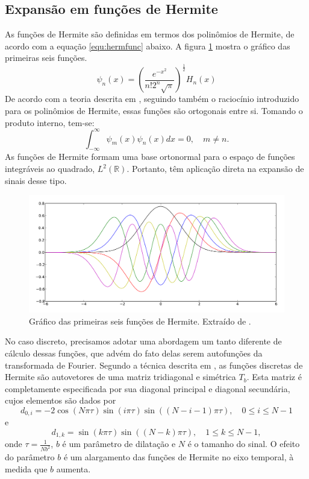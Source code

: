 \subsection*{Expansão em funções de Hermite}
As funções de Hermite são definidas em termos dos polinômios de Hermite, de acordo com a equação \ref{equ:hermfunc} abaixo. A figura \ref{fig:hermfunc} mostra o gráfico das primeiras seis funções.
\begin{equation}
    \psi_n(x) = \left(\frac{e^{-x^2}}{n!2^n\sqrt{\pi}}\right)^\frac{1}{2} H_n\left(x\right)
    \label{equ:hermfunc}
\end{equation}
De acordo com a teoria descrita em \cite{Abramowitz1974}, seguindo também o raciocínio introduzido para os polinômios de Hermite, essas funções são ortogonais entre si. Tomando o produto interno, tem-se:
\begin{equation}
     \int_{-\infty}^{\infty} \psi_m(x)\psi_n(x)dx = 0, \quad m\neq n.
\end{equation}
As funções de Hermite formam uma base ortonormal para o espaço de funções integráveis ao quadrado, $L^2(\mathbb{R})$. Portanto, têm aplicação direta na expansão de sinais desse tipo.

\begin{figure}[ht!]
    \centering
    \includegraphics[width=400pt]{figures/chap3-herm-functions.pdf}
    \caption[Gráfico das primeiras seis funções de Hermite]{Gráfico das primeiras seis funções de Hermite. Extraído de \cite{Dems2009}.}
    \label{fig:hermfunc}
\end{figure}

No caso discreto, precisamos adotar uma abordagem um tanto diferente de cálculo dessas funções, que advém do fato delas serem autofunções da transformada de Fourier. Segundo a técnica descrita em \cite{Mugler2002}, as funções discretas de Hermite são autovetores de uma matriz tridiagonal e simétrica $T_b$. Esta matriz é completamente especificada por sua diagonal principal e diagonal secundária, cujos elementos são dados por
\begin{equation}
    d_{0,i} = -2\cos(N\pi\tau)\sin(i\pi\tau)\sin((N-i-1)\pi\tau), \quad 0\leq i\leq N-1
    \label{equ:maindiag}
\end{equation}
e
\begin{equation}
    d_{1,k} = \sin(k\pi\tau)\sin((N-k)\pi\tau), \quad 1\leq k\leq N-1,
    \label{equ:offdiag}
\end{equation}
onde $\tau = \frac{1}{Nb^2}$, $b$ é um parâmetro de dilatação e $N$ é o tamanho do sinal. O efeito do parâmetro $b$ é um alargamento das funções de Hermite no eixo temporal, à medida que $b$ aumenta.

